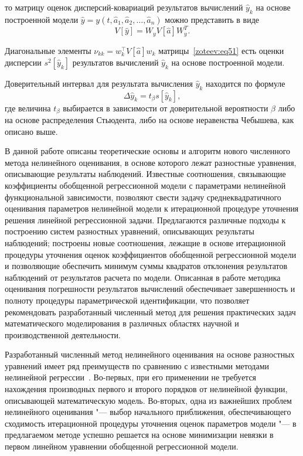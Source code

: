 \noindent
то матрицу оценок дисперсий-ковариаций результатов вычислений $\hat{y}_k$ на основе построенной модели $\hat{y}=y(t,\hat{a}_1,\hat{a}_2,\dots,\hat{a}_n)$ можно представить в виде
\begin{equation}
V[\hat{y}]=W_yV[\hat{a}]W_y^T.
\label{zoteev:eq51}
\end{equation}

Диагональные элементы $\nu_{kk}=w_k^{\top}V[\hat{a}]w_k$  матрицы~\eqref{zoteev:eq51} есть оценки дисперсии $s^2[\hat{y}_k]$ результатов вычислений $\hat{y}_k$ на основе построенной модели.

Доверительный интервал для результата вычисления $\hat{y}_k$  находится по формуле 
$$
\Delta\hat{y}_k=t_\beta s[\hat{y}_k],
$$ 
где величина $t_\beta$ выбирается в зависимости от доверительной вероятности $\beta$ либо на основе распределения Стьюдента, либо на основе неравенства Чебышева, как описано выше.

\smallskip

В данной работе описаны теоретические основы и алгоритм нового численного метода нелинейного оценивания, в основе которого лежат разностные уравнения, описывающие результаты наблюдений. Известные соотношения, связывающие коэффициенты обобщенной регрессионной модели с параметрами нелинейной функциональной зависимости, позволяют свести задачу среднеквадратичного оценивания параметров нелинейной модели к итерационной процедуре уточнения решения линейной регрессионной задачи. Предлагаются различные подходы к построению систем разностных уравнений, описывающих результаты наблюдений; построены новые соотношения, лежащие в основе итерационной процедуры уточнения оценок коэффициентов обобщенной регрессионной модели и позволяющие обеспечить минимум суммы квадратов отклонения результатов наблюдений от результатов расчета по модели. Описанная в работе методика оценивания погрешности результатов вычислений обеспечивает завершенность и полноту процедуры параметрической идентификации, что позволяет рекомендовать разработанный численный метод для решения практических задач математического моделирования в различных областях научной и производственной деятельности.

Разработанный численный метод нелинейного оценивания на основе разностных уравнений имеет ряд преимуществ по сравнению с известными методами нелинейной регрессии~\cite{zot:2,zot:3}. Во-первых, при его применении не требуется нахождения производных первого и второго порядков от нелинейной функции, описывающей математическую модель. Во-вторых, одна из важнейших проблем нелинейного оценивания "--- выбор начального приближения, обеспечивающего сходимость итерационной процедуры уточнения оценок параметров модели "--- в предлагаемом методе успешно решается на основе минимизации невязки в первом линейном уравнении обобщенной регрессионной модели.

